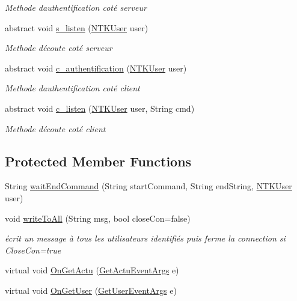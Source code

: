 \begin{DoxyCompactItemize}
\begin{DoxyCompactList}\small\item\em Methode d\textquotesingle{}authentification coté serveur \end{DoxyCompactList}\item 
abstract void \mbox{\hyperlink{class_n_t_k_1_1_service_1_1_n_t_k_service_a7c7cb8c5ddc57bebe6d9784744c976d7}{s\+\_\+listen}} (\mbox{\hyperlink{class_n_t_k_1_1_n_t_k_user}{N\+T\+K\+User}} user)
\begin{DoxyCompactList}\small\item\em Methode d\textquotesingle{}écoute coté serveur \end{DoxyCompactList}\item 
abstract void \mbox{\hyperlink{class_n_t_k_1_1_service_1_1_n_t_k_service_a8c2fd33b41da5a4edf9911682dfd36cd}{c\+\_\+authentification}} (\mbox{\hyperlink{class_n_t_k_1_1_n_t_k_user}{N\+T\+K\+User}} user)
\begin{DoxyCompactList}\small\item\em Methode d\textquotesingle{}authentification coté client \end{DoxyCompactList}\item 
abstract void \mbox{\hyperlink{class_n_t_k_1_1_service_1_1_n_t_k_service_a5f591a8d31f2e2b01fc47a17a4102574}{c\+\_\+listen}} (\mbox{\hyperlink{class_n_t_k_1_1_n_t_k_user}{N\+T\+K\+User}} user, String cmd)
\begin{DoxyCompactList}\small\item\em Methode d\textquotesingle{}écoute coté client \end{DoxyCompactList}\end{DoxyCompactItemize}
\subsection*{Protected Member Functions}
\begin{DoxyCompactItemize}
\item 
String \mbox{\hyperlink{class_n_t_k_1_1_service_1_1_n_t_k_service_ad8183abf2427e9f870547966179299de}{wait\+End\+Command}} (String start\+Command, String end\+String, \mbox{\hyperlink{class_n_t_k_1_1_n_t_k_user}{N\+T\+K\+User}} user)
\item 
void \mbox{\hyperlink{class_n_t_k_1_1_service_1_1_n_t_k_service_ac8736c068527f24512c6dc391babe861}{write\+To\+All}} (String msg, bool close\+Con=false)
\begin{DoxyCompactList}\small\item\em écrit un message à tous les utilisateurs identifiés puis ferme la connection si Close\+Con=true \end{DoxyCompactList}\item 
virtual void \mbox{\hyperlink{class_n_t_k_1_1_service_1_1_n_t_k_service_ac628c21c8284aedd78b4483d423dd2e4}{On\+Get\+Actu}} (\mbox{\hyperlink{class_n_t_k_1_1_events_args_1_1_get_actu_event_args}{Get\+Actu\+Event\+Args}} e)
\item 
virtual void \mbox{\hyperlink{class_n_t_k_1_1_service_1_1_n_t_k_service_a5899870c918bc4053398a25673810316}{On\+Get\+User}} (\mbox{\hyperlink{class_n_t_k_1_1_events_args_1_1_get_user_event_args}{Get\+User\+Event\+Args}} e)
\end{DoxyCompactItemize}
